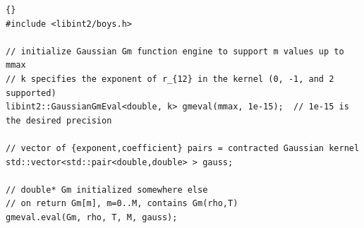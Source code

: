 \documentclass[10pt]{article}
\begin{document}
\begin{lstlisting}[label=lst:GmGaussian,caption=Computation of the $G_{m}$ function for the contracted Gaussian kernel using \LIBINT.]{}
#include <libint2/boys.h>

// initialize Gaussian Gm function engine to support m values up to mmax
// k specifies the exponent of r_{12} in the kernel (0, -1, and 2 supported)
libint2::GaussianGmEval<double, k> gmeval(mmax, 1e-15);  // 1e-15 is the desired precision

// vector of {exponent,coefficient} pairs = contracted Gaussian kernel
std::vector<std::pair<double,double> > gauss;

// double* Gm initialized somewhere else
// on return Gm[m], m=0..M, contains Gm(rho,T)
gmeval.eval(Gm, rho, T, M, gauss);
\end{lstlisting}
\end{document}
